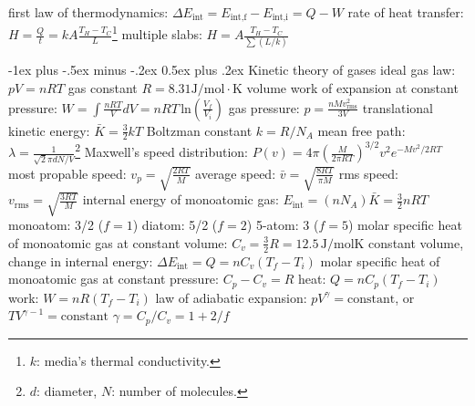\documentclass[10pt,landscape]{article}
\makeatletter
\renewcommand{\subsection}{\@startsection{subsection}{2}{0mm}%
                                {-1ex plus -.5ex minus -.2ex}%
                                {0.5ex plus .2ex}%
                                {\normalfont\normalsize\bfseries}}
\newcommand{\spc}{\hspace*{1em}}
\makeatother
\begin{document}
\begin{multicols}{3}
first law of thermodynamics: $\Delta E_\textrm{int}=E_{\textrm{int,f}}-E_{\textrm{int,i}}=Q-W$
\newline
rate of heat transfer: $H=\frac{Q}{t}=kA\frac{T_H-T_C}{L}$\footnote{$k$: media's thermal conductivity.}
\newline
\spc multiple slabs: $H=A\frac{T_H-T_C}{\sum (L/k)}$

\subsection{Kinetic theory of gases}
ideal gas law: $pV=nRT$
\newline 
gas constant $R=8.31\textrm{J}/\textrm{mol}\cdot \textrm{K}$
\newline
volume work of expansion at constant pressure: $W=\int \frac{nRT}{V}dV=nRT \, \mathrm{ln}(\frac{V_f}{V_i})$
\newline
gas pressure: $p=\frac{nMv_{\textrm{rms}}^2}{3V}$
\newline
translational kinetic energy: $\bar{K}=\frac{3}{2}kT$
\newline 
Boltzman constant $k=R/N_A$
\newline
mean free path: $\lambda =\frac{1}{\sqrt{2}\pi dN/V}$\footnote{$d$: diameter, $N$: number of molecules.}
\newline
Maxwell's speed distribution: $P(v)=4\pi (\frac{M}{2 \pi RT})^{3/2}v^2e^{-Mv^2/2RT}$
\newline
\spc most propable speed: $v_p=\sqrt{\frac{2RT}{M}}$
\newline
\spc average speed: $\bar{v}=\sqrt{\frac{8RT}{\pi M}}$
\newline
\spc rms speed: $v_{\mathrm{rms}}=\sqrt{\frac{3RT}{M}}$
\newline
internal energy of monoatomic gas: $E_{\mathrm{int}}=(nN_A)\bar{K}=\frac{3}{2}nRT$
\newline
\spc monoatom: 3/2 ($f=1$)
\newline 
\spc diatom: 5/2 ($f=2$)
\newline
\spc 5-atom: 3 ($f=5$)
\newline
molar specific heat of monoatomic gas at constant volume: $C_v=\frac{3}{2}R=12.5\,\textrm{J/molK}$
\newline
\spc constant volume, change in internal energy: 
\newline
\spc $\Delta E_{\textrm{int}}=Q=nC_v(T_f-T_i)$
\newline
molar specific heat of monoatomic gas at constant pressure: $C_p-C_v=R$
\newline
\spc heat: $Q=nC_p(T_f-T_i)$
\newline
\spc work: $W=nR(T_f-T_i)$
\newline
law of adiabatic expansion: $pV^\gamma =\textrm{constant}$, or $TV^{\gamma -1}=\textrm{constant}$
\newline
\spc $\gamma =C_p/C_v=1+2/f$


\end{multicols}
\end{document}
